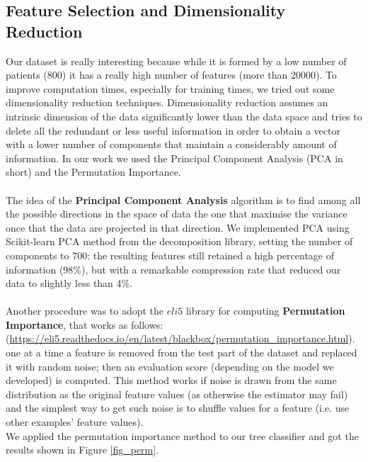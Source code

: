 \documentclass[12pt]{article}
\begin{document}
\subsection{Feature Selection and Dimensionality Reduction}
Our dataset is really interesting because while it is formed by a low number of patients (800) it has a really high number of features (more than 20000). To improve computation times, especially for training times, we tried out some dimensionality reduction techniques. Dimensionality reduction assumes an intrinsic dimension of the data significantly lower than the data space and tries to delete all the redundant or less useful information in order to obtain a vector with a lower number of components that maintain a considerably amount of information. In our work we used the Principal Component Analysis (PCA in short) and the Permutation Importance. \\ \\
The idea of the \textbf{Principal Component Analysis} algorithm is to find among all the possible directions in the space of data the one that maximise the variance once that the data are projected in that direction. We implemented  PCA using Scikit-learn PCA method from the decomposition library, setting the number of components to 700: the resulting features still retained a high percentage of information (98\%), but with a remarkable compression rate that reduced our data to slightly less than 4\%. \\ \\
Another procedure was to adopt the $eli5$ library for computing \textbf{Permutation Importance}, that works as follows:
(\url{https://eli5.readthedocs.io/en/latest/blackbox/permutation_importance.html}).
one at a time a feature is removed from the test part of the dataset and replaced it with random noise; then an evaluation score (depending on the model we developed) is computed. This method works if noise is drawn from the same distribution as the original feature values (as otherwise the estimator may fail) and the simplest way to get such noise is to shuffle values for a feature (i.e. use other examples' feature values). \\
We applied the permutation importance method to our tree classifier and got the results shown in Figure \ref{fig_perm}. \\
\end{document}
